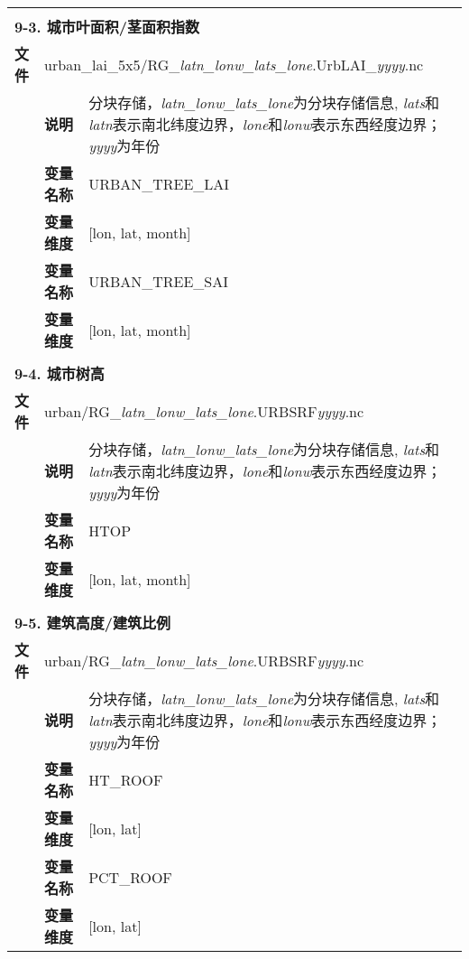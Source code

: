{\begin{longtable}{llp{}}
\midrule
\vspace{2\baselineskip}\\
\multicolumn{3}{l}{\textbf{9-3. 城市叶面积/茎面积指数}} \\
\cline{1-3}
\textbf{文件} & \multicolumn{2}{l}{urban\_lai\_5x5/RG\_\textit{latn\_lonw\_lats\_lone}.UrbLAI\_\textit{yyyy}.nc} \\
& \textbf{说明} & 分块存储，\textit{latn\_lonw\_lats\_lone}为分块存储信息, \textit{lats}和\textit{latn}表示南北纬度边界，\textit{lone}和\textit{lonw}表示东西经度边界；\textit{yyyy}为年份 \\
\cline{2-3}
& \textbf{变量名称} & URBAN\_TREE\_LAI \\
& \textbf{变量维度} & {[}lon, lat, month{]} \\
\cline{2-3}
& \textbf{变量名称} & URBAN\_TREE\_SAI \\
& \textbf{变量维度} & {[}lon, lat, month{]} \\

\midrule
\vspace{2\baselineskip}\\
\multicolumn{3}{l}{\textbf{9-4. 城市树高}} \\
\cline{1-3}
\textbf{文件} & \multicolumn{2}{l}{urban/RG\_\textit{latn\_lonw\_lats\_lone}.URBSRF\textit{yyyy}.nc} \\
& \textbf{说明} & 分块存储，\textit{latn\_lonw\_lats\_lone}为分块存储信息, \textit{lats}和\textit{latn}表示南北纬度边界，\textit{lone}和\textit{lonw}表示东西经度边界；\textit{yyyy}为年份 \\
\cline{2-3}
& \textbf{变量名称} & HTOP \\
& \textbf{变量维度} & {[}lon, lat, month{]} \\

\midrule
\vspace{2\baselineskip}\\
\multicolumn{3}{l}{\textbf{9-5. 建筑高度/建筑比例}} \\
\cline{1-3}
\textbf{文件} & \multicolumn{2}{l}{urban/RG\_\textit{latn\_lonw\_lats\_lone}.URBSRF\textit{yyyy}.nc} \\
& \textbf{说明} & 分块存储，\textit{latn\_lonw\_lats\_lone}为分块存储信息, \textit{lats}和\textit{latn}表示南北纬度边界，\textit{lone}和\textit{lonw}表示东西经度边界；\textit{yyyy}为年份 \\
\cline{2-3}
& \textbf{变量名称} & HT\_ROOF \\
& \textbf{变量维度} & {[}lon, lat{]} \\
\cline{2-3}
& \textbf{变量名称} & PCT\_ROOF \\
& \textbf{变量维度} & {[}lon, lat{]} \\


\end{longtable}}
